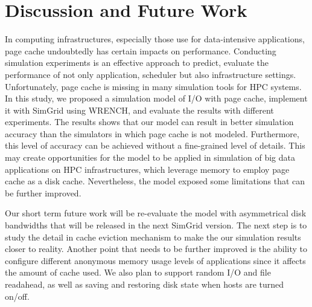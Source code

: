 \documentclass[conference]{IEEEtran}
\begin{document}
    \section{Discussion and Future Work}
    \label{discussion}
        In computing infrastructures, especially those use for data-intensive applications,
        page cache undoubtedly has certain impacts on performance.
        Conducting simulation experiments is an effective approach to predict,
        evaluate the performance of not only application, scheduler but also
        infrastructure settings.
        Unfortunately, page cache is missing in many simulation tools for HPC systems.
        In this study, we proposed a simulation model of I/O with page cache,
        implement it with SimGrid using WRENCH, and evaluate the results
        with different experiments.
        The results shows that our model can result in better simulation accuracy than
        the simulators in which page cache is not modeled.
        Furthermore, this level of accuracy can be achieved without a fine-grained
        level of details.
        This may create opportunities for the model to be applied in simulation of
        big data applications on HPC infrastructures, which leverage memory to
        employ page cache as a disk cache.
        Nevertheless, the model exposed some limitations that can be
        further improved.

        Our short term future work will be re-evaluate the model with asymmetrical
        disk bandwidths that will be released in the next SimGrid version.
        The next step is to study the detail in cache eviction mechanism to make
        the our simulation results closer to reality.
        Another point that needs to be further improved is the ability to configure
        different anonymous memory usage levels of applications since it affects
        the amount of cache used.
        We also plan to support random I/O and file readahead, as well as
        saving and restoring disk state when hosts are turned on/off.



\end{document}
